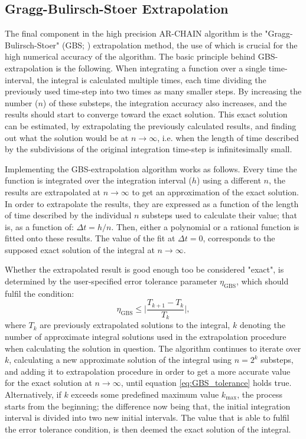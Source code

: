 \documentclass[english, twoside]{HYgradu}
\begin{document}
\subsection{Gragg-Bulirsch-Stoer Extrapolation} \label{section:extrapolation}

The final component in the high precision AR-CHAIN algorithm is the "Gragg-Bulirsch-Stoer" (GBS; \citealt{Gragg1965, Bulirsch1966}) extrapolation method, the use of which is crucial for the high numerical accuracy of the algorithm. The basic principle behind GBS-extrapolation is the following. When integrating a function over a single time-interval, the integral is calculated multiple times, each time dividing the previously used time-step into two times as many smaller steps. By increasing the number ($n$) of these substeps, the integration accuracy also increases, and the results should start to converge toward the exact solution. This exact solution can be estimated, by extrapolating the previously calculated results, and finding out what the solution would be at $n \rightarrow \infty$, i.e. when the length of time described by the subdivisions of the original integration time-step is infinitesimally small.

Implementing the GBS-extrapolation algorithm works as follows. Every time the function is integrated over the integration interval ($h$) using a different $n$, the results are extrapolated at $n \rightarrow \infty$ to get an approximation of the exact solution. In order to extrapolate the results, they are expressed as a function of the length of time described by the individual $n$ substeps used to calculate their value; that is, as a function of: $\Delta t = h/n$. Then, either a polynomial or a rational function is fitted onto these results. The value of the fit at $\Delta t = 0$, corresponds to the supposed exact solution of the integral at $n \rightarrow \infty$.

Whether the extrapolated result is good enough too be considered "exact", is determined by the user-specified error tolerance parameter $\eta_\mathrm{GBS}$, which should fulfil the condition:
\begin{equation}
\eta_\mathrm{GBS} \leq \bigg| \frac{T_{k+1} - T_k}{T_k} \bigg|, \label{eq:GBS_tolerance}
\end{equation}
where $T_k$ are previously extrapolated solutions to the integral, $k$ denoting the number of approximate integral solutions used in the extrapolation procedure when calculating the solution in question. The algorithm continues to iterate over $k$, calculating a new approximate solution of the integral using $n = 2^k$ substeps, and adding it to extrapolation procedure in order to get a more accurate value for the exact solution at $n \rightarrow \infty$, until equation \ref{eq:GBS_tolerance} holds true. Alternatively, if $k$ exceeds some predefined maximum value $k_\mathrm{max}$, the process starts from the beginning; the difference now being that, the initial integration interval is divided into two new initial intervals. The value that is able to fulfil the error tolerance condition, is then deemed the exact solution of the integral.
\end{document}
